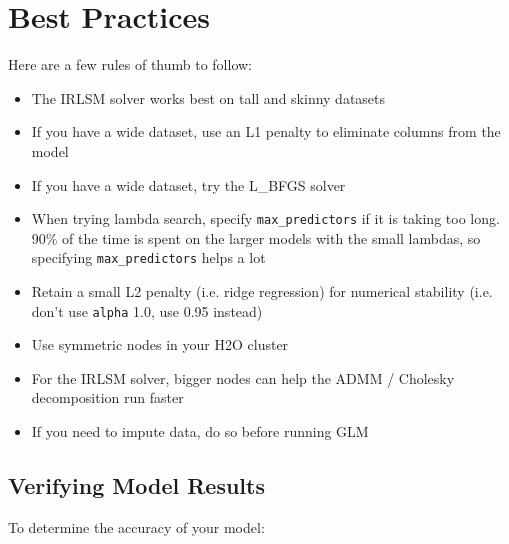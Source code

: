 \section{Best Practices}

Here are a few rules of thumb to follow:

\begin{itemize}
\item The IRLSM solver works best on tall and skinny datasets
\item If you have a wide dataset, use an L1 penalty to eliminate columns from the model
\item If you have a wide dataset, try the L\_BFGS solver
\item When trying lambda search, specify \texttt{max\_predictors} if it is taking too long. 90\% of the time is spent on the larger models with the small lambdas, so specifying \texttt{max\_predictors} helps a lot
\item Retain a small L2 penalty (i.e. ridge regression) for numerical stability (i.e. don’t use \texttt{alpha} 1.0, use 0.95 instead)
\item Use symmetric nodes in your H2O cluster
\item For the IRLSM solver, bigger nodes can help the ADMM / Cholesky decomposition run faster
\item If you need to impute data, do so before running GLM
\end{itemize}

\subsection{Verifying Model Results}

To determine the accuracy of your model: 

